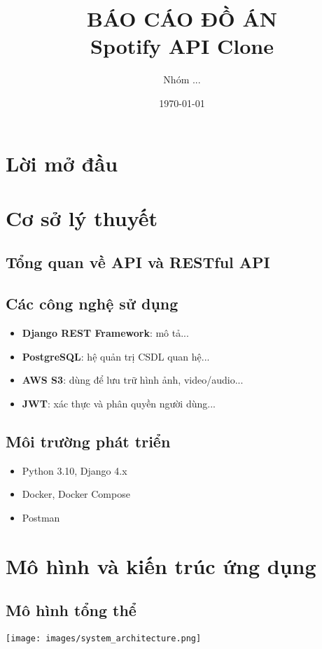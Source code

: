 \documentclass[12pt,a4paper]{report}
\title{BÁO CÁO ĐỒ ÁN \\[1em] Spotify API Clone}
\author{Nhóm ...}
\date{\today}
\begin{document}
\maketitle
\tableofcontents
\chapter*{Lời mở đầu}

\chapter{Cơ sở lý thuyết}
\section{Tổng quan về API và RESTful API}
\section{Các công nghệ sử dụng}
\begin{itemize}
    \item \textbf{Django REST Framework}: mô tả...
    \item \textbf{PostgreSQL}: hệ quản trị CSDL quan hệ...
    \item \textbf{AWS S3}: dùng để lưu trữ hình ảnh, video/audio...
    \item \textbf{JWT}: xác thực và phân quyền người dùng...
\end{itemize}
\section{Môi trường phát triển}
\begin{itemize}
    \item Python 3.10, Django 4.x
    \item Docker, Docker Compose
    \item Postman
\end{itemize}

\chapter{Mô hình và kiến trúc ứng dụng}
\section{Mô hình tổng thể}
\texttt{[image: images/system\_architecture.png]}
\end{document}
